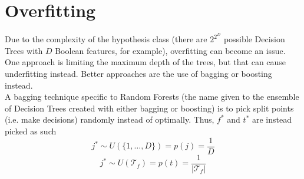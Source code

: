 \documentclass[12pt]{article}
\begin{document}
\section{Overfitting}

Due to the complexity of the hypothesis class (there are $2^{2^D}$ possible Decision Trees with $D$ Boolean features, for example), overfitting can become an issue. One approach is limiting the maximum depth of the trees, but that can cause underfitting instead. Better approaches are the use of bagging or boosting instead.
\\\newline
A bagging technique specific to Random Forests (the name given to the ensemble of Decision Trees created with either bagging or boosting) is to pick split points (i.e. make decisions) randomly instead of optimally. Thus, $f^*$ and $t^*$ are instead picked as such
\[ j^* \sim U(\{1,\dots,D\}) = p(j) = \frac{1}{D} \]
\[ j^* \sim U(\mathcal{T}_f) = p(t) = \frac{1}{|\mathcal{T}_f|} \]
\end{document}
